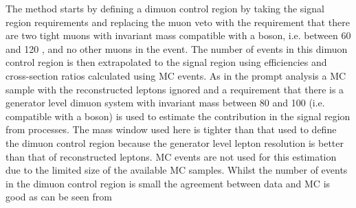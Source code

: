 The method starts by defining a dimuon control region by taking the signal region requirements and replacing the muon veto with the requirement that there are two tight muons with invariant mass compatible with a \PZ boson, i.e. between 60 and 120 \GeV, and no other muons in the event. The number of events in this dimuon control region is then extrapolated to the signal region using efficiencies and cross-section ratios calculated using \ac{MC} events. As in the prompt analysis a \Zmumu \ac{MC} sample with the reconstructed leptons ignored and a requirement that there is a generator level dimuon system with invariant mass between 80 and 100 \GeV (i.e. compatible with a \PZ boson) is used to estimate the contribution in the signal region from \Znunu processes. The mass window used here is tighter than that used to define the dimuon control region because the generator level lepton \pt resolution is better than that of reconstructed leptons. \Znunu \ac{MC} events are not used for this estimation due to the limited size of the available \Znunu \ac{MC} samples. Whilst the number of events in the dimuon control region is small the agreement between data and \ac{MC} is good as can be seen from 

